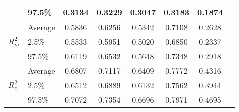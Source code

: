 \begin{table}[!ht]
\begin{tabular}{@{}llcccccc@{}}
                                           & 97.5\%  & 0.3134 & 0.3229 & 0.3047 & 0.3183 & 0.1874 \\ \midrule
      \multirow{3}{*}{$R^2_m$}            & Average & 0.5836 & 0.6256 & 0.5342 & 0.7108 & 0.2628 \\
                                           & 2.5\%   & 0.5533 & 0.5951 & 0.5020 & 0.6850 & 0.2337 \\
                                           & 97.5\%  & 0.6119 & 0.6532 & 0.5648 & 0.7348 & 0.2918 \\ \midrule
      \multirow{3}{*}{$R^2_c$}            & Average & 0.6807 & 0.7117 & 0.6409 & 0.7772 & 0.4316 \\
                                           & 2.5\%   & 0.6512 & 0.6889 & 0.6132 & 0.7562 & 0.3944 \\
                                           & 97.5\%  & 0.7072 & 0.7354 & 0.6696 & 0.7971 & 0.4695 \\ \bottomrule
    \end{tabular}    

\end{table}
